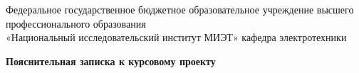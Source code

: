 \documentclass[12pt]{article}
\begin{document}
\begin{center}
	
Федеральное государственное бюджетное образовательное учреждение высшего\\
профессионального образования\\
«Национальный исследовательский институт МИЭТ»
\vskip2cm
кафедра электротехники
\vskip2cm
{
  \setlength{\parindent}{0pt}
  \linespread{1.5}\selectfont %
  \centering\titletimesnewroman\bfseries
  Пояснительная записка к курсовому проекту\par
  \titletimesnewroman\bfseries
  \par
  \par
}

\end{center}
\end{document}
